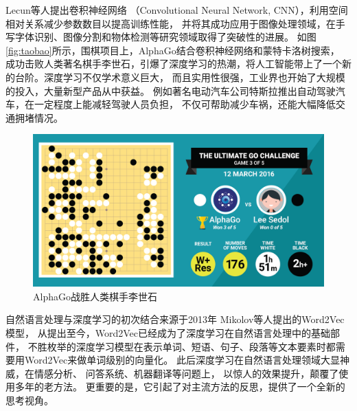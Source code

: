 Lecun等人\parencite{lecun1989backpropagation}提出卷积神经网络
（Convolutional Neural Network, CNN），利用空间相对关系减少参数数目以提高训练性能，
并将其成功应用于图像处理领域，在手写字体识别、图像分割和物体检测等研究领域取得了突破性的进展。
如图\ref{fig:taobao}所示，围棋项目上，AlphaGo\parencite{silver2016mastering}结合卷积神经网络和蒙特卡洛树搜索，
成功击败人类著名棋手李世石，引爆了深度学习的热潮，将人工智能带上了一个新的台阶。深度学习不仅学术意义巨大，
而且实用性很强，工业界也开始了大规模的投入，大量新型产品从中获益。
例如著名电动汽车公司特斯拉推出自动驾驶汽车\parencite{bengio2009learning}，在一定程度上能减轻驾驶人员负担，
不仅可帮助减少车祸，还能大幅降低交通拥堵情况。

\begin{figure}[htbp]
\centering
\includegraphics[scale=0.22]{images/alphago.png}
\caption{AlphaGo战胜人类棋手李世石}
\label{fig:alphago}
\end{figure}

自然语言处理与深度学习的初次结合来源于2013年
Mikolov等人\parencite{mikolov2013efficient,le2014distributed,bojanowski2016enriching}提出的Word2Vec模型，
从提出至今，Word2Vec已经成为了深度学习在自然语言处理中的基础部件，
不胜枚举的深度学习模型在表示单词、短语、句子、段落等文本要素时都需要用Word2Vec来做单词级别的向量化。
此后深度学习在自然语言处理领域大显神威，在情感分析\parencite{socher2013recursive}、
问答系统\parencite{li2016deep}、机器翻译\parencite{bahdanau2014neural}等问题上，
以惊人的效果提升，颠覆了使用多年的老方法。
更重要的是，它引起了对主流方法的反思，提供了一个全新的思考视角。

